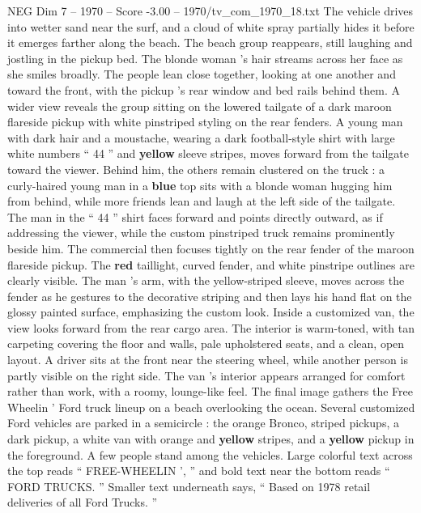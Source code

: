 \begin{textsample}{NEG Dim 7 – 1970 – Score -3.00 – 1970/tv\_com\_1970\_18.txt}
The vehicle drives into wetter sand near the surf, and a cloud of white spray partially hides it before it emerges farther along the beach.
The beach group reappears, still laughing and jostling in the pickup bed.
The blonde woman ’s hair streams across her face as she smiles broadly.
The people lean close together, looking at one another and toward the front, with the pickup ’s rear window and bed rails behind them.
A wider view reveals the group sitting on the lowered tailgate of a dark maroon flareside pickup with white pinstriped styling on the rear fenders.
A young man with dark hair and a moustache, wearing a dark football-style shirt with large white numbers “ 44 ” and \textbf{yellow} sleeve stripes, moves forward from the tailgate toward the viewer.
Behind him, the others remain clustered on the truck : a curly-haired young man in a \textbf{blue} top sits with a blonde woman hugging him from behind, while more friends lean and laugh at the left side of the tailgate.
The man in the “ 44 ” shirt faces forward and points directly outward, as if addressing the viewer, while the custom pinstriped truck remains prominently beside him.
The commercial then focuses tightly on the rear fender of the maroon flareside pickup.
The \textbf{red} taillight, curved fender, and white pinstripe outlines are clearly visible.
The man ’s arm, with the yellow-striped sleeve, moves across the fender as he gestures to the decorative striping and then lays his hand flat on the glossy painted surface, emphasizing the custom look.
Inside a customized van, the view looks forward from the rear cargo area.
The interior is warm-toned, with tan carpeting covering the floor and walls, pale upholstered seats, and a clean, open layout.
A driver sits at the front near the steering wheel, while another person is partly visible on the right side.
The van ’s interior appears arranged for comfort rather than work, with a roomy, lounge-like feel.
The final image gathers the Free Wheelin ’ Ford truck lineup on a beach overlooking the ocean.
Several customized Ford vehicles are parked in a semicircle : the orange Bronco, striped pickups, a dark pickup, a white van with orange and \textbf{yellow} stripes, and a \textbf{yellow} pickup in the foreground.
A few people stand among the vehicles.
Large colorful text across the top reads “ FREE-WHEELIN ’, ” and bold text near the bottom reads “ FORD TRUCKS. ” Smaller text underneath says, “ Based on 1978 retail deliveries of all Ford Trucks. ”

\end{textsample}
